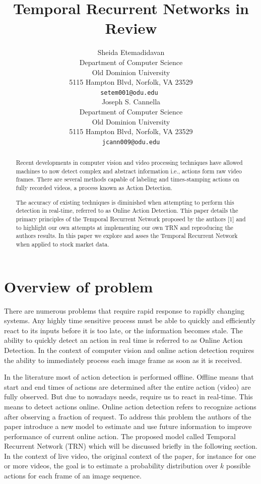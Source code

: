 \documentclass{article}
\title{Temporal Recurrent Networks in Review}
\author{%
  Sheida Etemadidavan\\
  Department of Computer Science\\
  Old Dominion University\\
  5115 Hampton Blvd, Norfolk, VA 23529 \\
  \texttt{setem001@odu.edu } \\
  \And
    Joseph S. Cannella\\
  Department of Computer Science\\
  Old Dominion University\\
  5115 Hampton Blvd, Norfolk, VA 23529 \\
  \texttt{jcann009@odu.edu} \\
}
\begin{document}
\maketitle

\begin{abstract}
    Recent developments in computer vision and video processing techniques have allowed machines to now detect complex and abstract information i.e., actions form raw video frames. There are several methods capable of labeling and times-stamping actions on fully recorded videos, a process known as Action Detection.
    
    The accuracy of existing techniques is diminished when attempting to perform this detection in real-time, referred to as Online Action Detection. This paper details the primary principles of the Temporal Recurrent Network proposed by the authors [1] and to highlight our own attempts at implementing our own TRN and reproducing the authors results. In this paper we explore and asses the Temporal Recurrent Network when applied to stock market data.
\end{abstract}

\section{Overview of problem}

    There are numerous problems that require rapid response to rapidly changing systems. Any highly time sensitive process must be able to quickly and efficiently react to its inputs before it is too late, or the information becomes stale. The ability to quickly detect an action in real time is referred to as Online Action Detection. In the context of computer vision and online action detection requires the ability to immediately process each image frame as soon as it is received.
    
    In the literature most of action detection is performed offline. Offline means that start and end times of actions are determined after the entire action (video) are fully observed. But due to nowadays needs, require us to react in real-time. This means to detect actions online. Online action detection refers to recognize actions after observing a fraction of request. To address this problem the authors of the paper introduce a new model to estimate and use future information to improve performance of current online action. The proposed model called Temporal Recurrent Network (TRN) which will be discussed briefly in the following section. In the context of live video, the original context of the paper, for instance for one or more videos, the goal is to estimate a probability distribution over $k$ possible actions for each frame of an image sequence.
    
\end{document}
